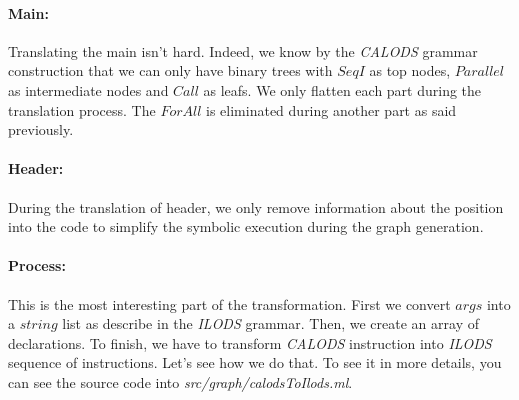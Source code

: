 \documentclass{article}
\begin{document}
\paragraph{Main:}
Translating the main isn't hard. Indeed, we know by the \textit{CALODS} grammar construction that we can only have binary trees with $SeqI$ as top nodes, $Parallel$ as intermediate nodes and $Call$ as leafs. We only flatten each part during the translation process. The $ForAll$ is eliminated during another part as said previously.  
      
\paragraph{Header:}
During the translation of header, we only remove information about the position into the code to simplify the symbolic execution during the graph generation.

\paragraph{Process:}
This is the most interesting part of the transformation. First we convert $args$ into a $string$ list as describe in the \textit{ILODS} grammar. Then, we create an array of declarations. To finish, we have to transform \textit{CALODS} instruction into \textit{ILODS} sequence of instructions. Let's see how we do that. To see it in more details, you can see the source code into \textit{src/graph/calodsToIlods.ml}. 
\end{document}
